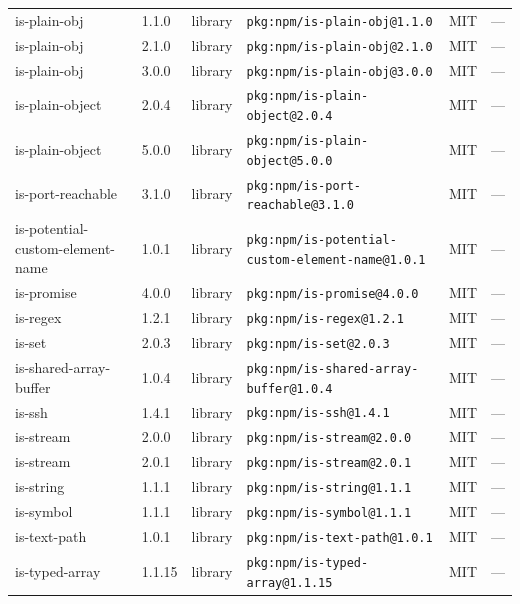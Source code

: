 \documentclass[11pt,a4paper]{article}
\begin{document}
\begin{longtable}{|p{4cm}|p{2cm}|p{1.6cm}|p{5cm}|p{1.5cm}|p{3.5cm}|}
\raggedright is-plain-obj & 1.1.0 & library & \small\texttt{pkg:npm/is-plain-obj@1.1.0} & MIT & \small — \\
\raggedright is-plain-obj & 2.1.0 & library & \small\texttt{pkg:npm/is-plain-obj@2.1.0} & MIT & \small — \\
\raggedright is-plain-obj & 3.0.0 & library & \small\texttt{pkg:npm/is-plain-obj@3.0.0} & MIT & \small — \\
\raggedright is-plain-object & 2.0.4 & library & \small\texttt{pkg:npm/is-plain-object@2.0.4} & MIT & \small — \\
\raggedright is-plain-object & 5.0.0 & library & \small\texttt{pkg:npm/is-plain-object@5.0.0} & MIT & \small — \\
\raggedright is-port-reachable & 3.1.0 & library & \small\texttt{pkg:npm/is-port-reachable@3.1.0} & MIT & \small — \\
\raggedright is-potential-custom-element-name & 1.0.1 & library & \small\texttt{pkg:npm/is-potential-custom-element-name@1.0.1} & MIT & \small — \\
\raggedright is-promise & 4.0.0 & library & \small\texttt{pkg:npm/is-promise@4.0.0} & MIT & \small — \\
\raggedright is-regex & 1.2.1 & library & \small\texttt{pkg:npm/is-regex@1.2.1} & MIT & \small — \\
\raggedright is-set & 2.0.3 & library & \small\texttt{pkg:npm/is-set@2.0.3} & MIT & \small — \\
\raggedright is-shared-array-buffer & 1.0.4 & library & \small\texttt{pkg:npm/is-shared-array-buffer@1.0.4} & MIT & \small — \\
\raggedright is-ssh & 1.4.1 & library & \small\texttt{pkg:npm/is-ssh@1.4.1} & MIT & \small — \\
\raggedright is-stream & 2.0.0 & library & \small\texttt{pkg:npm/is-stream@2.0.0} & MIT & \small — \\
\raggedright is-stream & 2.0.1 & library & \small\texttt{pkg:npm/is-stream@2.0.1} & MIT & \small — \\
\raggedright is-string & 1.1.1 & library & \small\texttt{pkg:npm/is-string@1.1.1} & MIT & \small — \\
\raggedright is-symbol & 1.1.1 & library & \small\texttt{pkg:npm/is-symbol@1.1.1} & MIT & \small — \\
\raggedright is-text-path & 1.0.1 & library & \small\texttt{pkg:npm/is-text-path@1.0.1} & MIT & \small — \\
\raggedright is-typed-array & 1.1.15 & library & \small\texttt{pkg:npm/is-typed-array@1.1.15} & MIT & \small — \\

\end{longtable}
\end{document}
